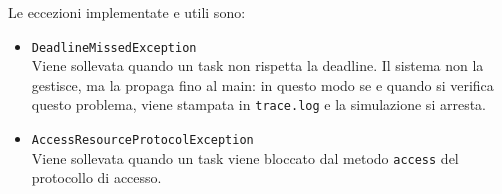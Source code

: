 \myskip

Le eccezioni implementate e utili sono:
\begin{itemize}
    \item \texttt{DeadlineMissedException} \\
        Viene sollevata quando un task non rispetta la deadline. Il sistema non la gestisce, ma la propaga fino al main: in questo modo se e quando si verifica questo problema, viene stampata in \texttt{trace.log} e la simulazione si arresta.
    \item \texttt{AccessResourceProtocolException} \\
        Viene sollevata quando un task viene bloccato dal metodo \texttt{access} del protocollo di accesso.
\end{itemize}